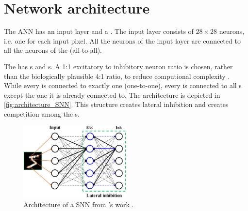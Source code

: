\section{Network architecture}
\label{subsec:architecture}


The \ac{ANN} has an input layer and a \pLayer{} \cite{SNN}.
The input layer consists of $28 \times 28$ neurons, i.e. one for each input pixel.
All the neurons of the input layer are connected to all the neurons of the \pLayer{} (all-to-all).

The \pLayer{} has \eN{}s and \iN{}s.
A 1:1 excitatory to inhibitory neuron ratio is chosen, rather than the biologically plausible 4:1 ratio, 
to reduce computional complexity \cite{SNN}.
While every \eN{} is connected to exactly one \iN{} (one-to-one), every \iN{} is connected to all \eN{}s except the one it is already connected to.
The architecture is depicted in \autoref{fig:architecture_SNN}.
This structure creates lateral inhibition and creates competition among the \eN{}s.
\vspace{-4mm}
\begin{figure}[htbp]
    \center
    \includegraphics[width=0.5\textwidth]{pictures/fnins-15-638474-g001.jpg}
    \caption{Architecture of a \ac{SNN} from \authorsArchitectureSNNpicture{}'s work \cite{architecture_SNN_picture}.}
    \label{fig:architecture_SNN}
\end{figure}